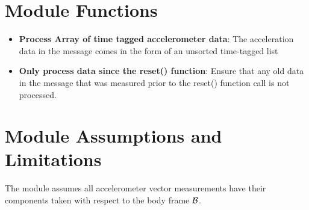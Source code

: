 

\section{Module Functions}
\begin{itemize}
	\item \textbf{Process Array of time tagged accelerometer data}: The acceleration data in the message comes in the form of an unsorted time-tagged list
	\item \textbf{Only process data since the reset() function}: Ensure that any old data in the message that was measured prior to the reset() function call is not processed.
\end{itemize}

\section{Module Assumptions and Limitations}
The module assumes all accelerometer vector measurements have their components taken with respect to the body frame $\cal B$.
